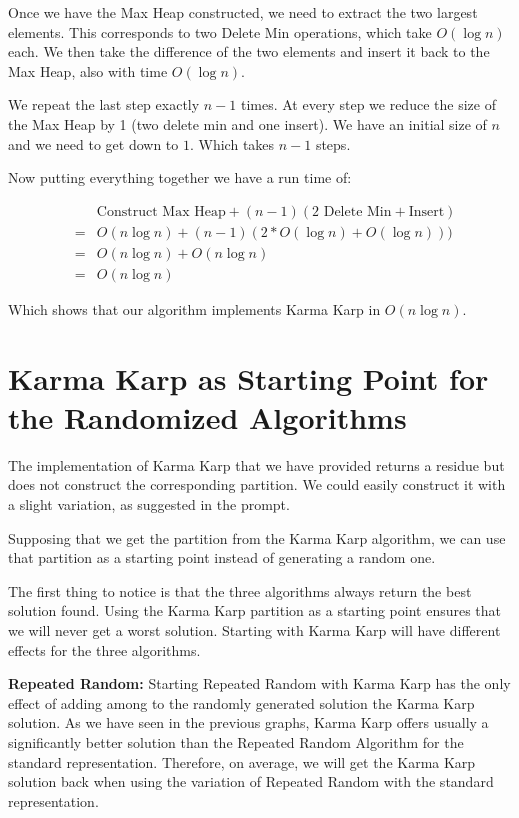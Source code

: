 \documentclass[11pt]{article}
\begin{document}
Once we have the Max Heap constructed, we need to extract the two largest elements. This corresponds to two Delete Min operations, which take $O(\log n)$ each. We then take the difference of the two elements and insert it back to the Max Heap, also with time $O(\log n)$.

We repeat the last step exactly $n-1$ times. At every step we reduce the size of the Max Heap by 1 (two delete min and one insert). We have an initial size of $n$ and we need to get down to $1$. Which takes $n-1$ steps.

Now putting everything together we have a run time of:

\begin{eqnarray}
&&\text{Construct Max Heap} + (n-1)(\text{2 Delete Min}+\text{Insert})\\
&=& O(n \log n)+(n-1)(2*O(\log n)+O(\log n)))\\
&=& O(n\log n) + O(n\log n)\\
&=& \boxed{O(n\log n)}
\end{eqnarray}

Which shows that our algorithm implements Karma Karp in $O(n\log n)$.


\section{Karma Karp as Starting Point for the Randomized Algorithms}
The implementation of Karma Karp that we have provided returns a residue but does not construct the corresponding partition. We could easily construct it with a slight variation, as suggested in the prompt.

Supposing that we get the partition from the Karma Karp algorithm, we can use that partition as a starting point instead of generating a random one.

The first thing to notice is that the three algorithms always return the best solution found. Using the Karma Karp partition as a starting point ensures that we will never get a worst solution. Starting with Karma Karp will have different effects for the three algorithms.


\textbf{Repeated Random:}
Starting Repeated Random with Karma Karp has the only effect of adding among to the randomly generated solution the Karma Karp solution. As we have seen in the previous graphs, Karma Karp offers usually a significantly better solution than the Repeated Random Algorithm for the standard representation. Therefore, on average, we will get the Karma Karp solution back when using the variation of Repeated Random with the standard representation.
\end{document}

